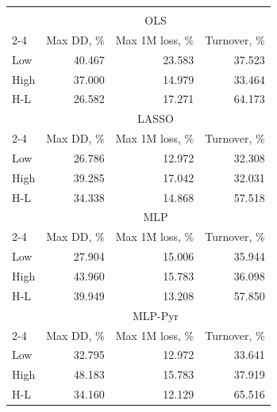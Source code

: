 \begin{tabular}{lrrr}
\hline \hline \\ [-1.8ex]
 & \multicolumn{3}{c}{OLS} \\
 \cmidrule(lr){2-4}
  & Max DD, \% & Max 1M loss, \% & Turnover, \% \\
\midrule
Low & 40.467 & 23.583 & 37.523 \\
High & 37.000 & 14.979 & 33.464 \\
H-L & 26.582 & 17.271 & 64.173 \\
\midrule
 & \multicolumn{3}{c}{LASSO} \\
 \cmidrule(lr){2-4}
  & Max DD, \% & Max 1M loss, \% & Turnover, \% \\
\midrule
Low & 26.786 & 12.972 & 32.308 \\
High & 39.285 & 17.042 & 32.031 \\
H-L & 34.338 & 14.868 & 57.518 \\
\midrule
 & \multicolumn{3}{c}{MLP} \\
 \cmidrule(lr){2-4}
  & Max DD, \% & Max 1M loss, \% & Turnover, \% \\
\midrule
Low & 27.904 & 15.006 & 35.944 \\
High & 43.960 & 15.783 & 36.098 \\
H-L & 39.949 & 13.208 & 57.850 \\
\midrule
 & \multicolumn{3}{c}{MLP-Pyr} \\
 \cmidrule(lr){2-4}
  & Max DD, \% & Max 1M loss, \% & Turnover, \% \\
\midrule
Low & 32.795 & 12.972 & 33.641 \\
High & 48.183 & 15.783 & 37.919 \\
H-L & 34.160 & 12.129 & 65.516 \\
\hline \hline
\end{tabular}